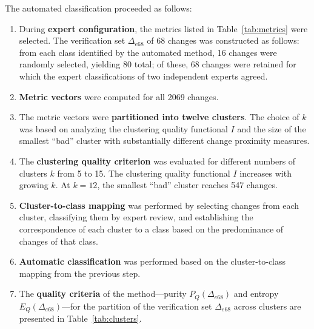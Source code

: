 \documentclass[11pt,a4paper]{article}
\begin{document}
The automated classification proceeded as follows:

\begin{enumerate}
    \item During \textbf{expert configuration}, the metrics listed in Table~\ref{tab:metrics} were selected. The verification set $\Delta_{e68}$ of 68 changes was constructed as follows: from each class identified by the automated method, 16 changes were randomly selected, yielding 80 total; of these, 68 changes were retained for which the expert classifications of two independent experts agreed.

    \item \textbf{Metric vectors} were computed for all 2069 changes.

    \item The metric vectors were \textbf{partitioned into twelve clusters}. The choice of $k$ was based on analyzing the clustering quality functional $I$ and the size of the smallest ``bad'' cluster with substantially different change proximity measures.

    \item The \textbf{clustering quality criterion} was evaluated for different numbers of clusters $k$ from 5 to 15. The clustering quality functional $I$ increases with growing $k$. At $k = 12$, the smallest ``bad'' cluster reaches 547 changes.

    \item \textbf{Cluster-to-class mapping} was performed by selecting changes from each cluster, classifying them by expert review, and establishing the correspondence of each cluster to a class based on the predominance of changes of that class.

    \item \textbf{Automatic classification} was performed based on the cluster-to-class mapping from the previous step.

    \item The \textbf{quality criteria} of the method---purity $P_Q(\Delta_{e68})$ and entropy $E_Q(\Delta_{e68})$---for the partition of the verification set $\Delta_{e68}$ across clusters are presented in Table~\ref{tab:clusters}.
\end{enumerate}
\end{document}
